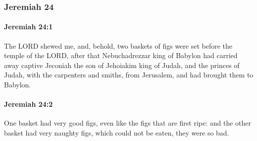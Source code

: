 	\subsubsection{Jeremiah 24} %
		\label{JEREMIAH-24}

		\paragraph{Jeremiah 24:1} %
			\label{JEREMIAH-24-1}

			The LORD shewed me, and, behold, two baskets of figs were set before the temple of the LORD, after that Nebuchadrezzar king of Babylon had carried away captive Jeconiah the son of Jehoiakim king of Judah, and the princes of Judah, with the carpenters and smiths, from Jerusalem, and had brought them to Babylon.


		\paragraph{Jeremiah 24:2} %
			\label{JEREMIAH-24-2}

			One basket had very good figs, even like the figs that are first ripe: and the other basket had very naughty figs, which could not be eaten, they were so bad.


